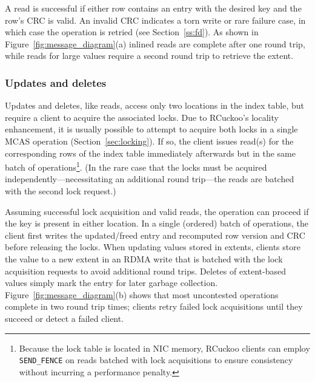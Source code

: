 A read is successful if either row contains an entry with the desired
key and the row's CRC is valid. An invalid CRC indicates a torn write
or rare failure case, in which case the operation is retried
(see Section~\ref{ss:fd}).  As shown in
Figure~\ref{fig:message_diagram}(a) inlined reads are complete after
one round trip, while reads for large values require a second round
trip to retrieve the extent.


\subsubsection{Updates and deletes}

Updates and deletes, like reads, access only two locations in the
index table, but require a client to acquire the associated locks.
Due to RCuckoo's locality enhancement, it is usually possible to attempt
to acquire both locks in a single MCAS operation
(Section~\ref{sec:locking}).  If so, the client issues read(s) for the
corresponding rows of the index table immediately afterwards but in
the same batch of operations\footnote{Because the lock table is located in NIC memory, RCuckoo clients can employ \texttt{SEND\_FENCE} on reads batched with lock acquisitions to ensure consistency without incurring a performance penalty.}.  (In the rare case that the locks must
be acquired independently---necessitating an additional round
trip---the reads are batched with the second lock request.)

Assuming
successful lock acquisition and valid reads, the operation can proceed
if the key is present in either location.  In a single (ordered) batch
of operations, the client first writes the updated/freed entry and
recomputed row version and CRC before releasing the locks. When
updating values stored in extents, clients store the value to a new
extent in an RDMA write that is batched with the lock acquisition
requests to avoid additional round trips.  Deletes of extent-based
values simply mark the entry for later garbage collection.
Figure~\ref{fig:message_diagram}(b) shows that most uncontested operations
complete in two round trip times; clients retry failed lock
acquisitions until they succeed or detect a failed client.



